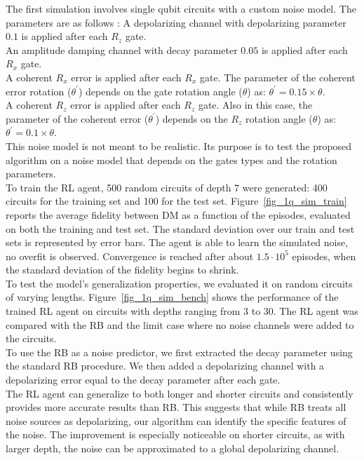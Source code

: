 \documentclass[sn-basic]{sn-jnl} %
\begin{document}
The first simulation involves single qubit circuits with a custom noise model. The parameters are as follows :
A depolarizing channel with depolarizing parameter $0.1$ is applied after each $R_z$ gate.\\
An amplitude damping channel with decay parameter $0.05$ is applied after each $R_x$ gate.\\
A coherent $R_x$ error is applied after each $R_x$ gate. The parameter of the coherent error rotation 
($\theta^{'}$) depends on the gate rotation angle ($\theta$) as: $\theta^{'}=0.15\times\theta$.\\
A coherent $R_z$ error is applied after each $R_z$ gate. Also in this case, the parameter of the coherent 
error ($\theta^{'}$) depends on the $R_z$ rotation angle ($\theta$) as: $\theta^{'}=0.1\times\theta$.\\
This noise model is not meant to be realistic. Its purpose is to test the proposed algorithm on a noise model 
that depends on the gates types and the rotation parameters.\\
To train the RL agent, 500 random circuits of depth 7 were generated: 400 circuits for the training set and 
100 for the test set. Figure~\ref{fig_1q_sim_train} reports the average fidelity between DM as a function of 
the episodes, evaluated on both the training and test set. The standard deviation over our train and test sets 
is represented by error bars. The agent is able to learn the simulated noise, no overfit is observed. 
Convergence is reached after about $1.5\cdot10^5$ episodes, when the standard deviation of the fidelity begins 
to shrink.\\

\noindent
To test the model's generalization properties, we evaluated it on random circuits of varying lengths. 
Figure~\ref{fig_1q_sim_bench} shows the performance of the trained RL agent on circuits with depths ranging from 3 to 30. 
The RL agent was compared with the RB and the limit case where no noise channels were added to the circuits.\\
To use the RB as a noise predictor, we first extracted the decay parameter using the standard RB procedure. 
We then added a depolarizing channel with a depolarizing error equal to the decay parameter after each gate.\\
The RL agent can generalize to both longer and shorter circuits and consistently provides more accurate results than RB. 
This suggests that while RB treats all noise sources as depolarizing, our algorithm can identify the specific features of the noise. 
The improvement is especially noticeable on shorter circuits, as with larger depth, the noise can be approximated to a global depolarizing channel.\\
\end{document}
